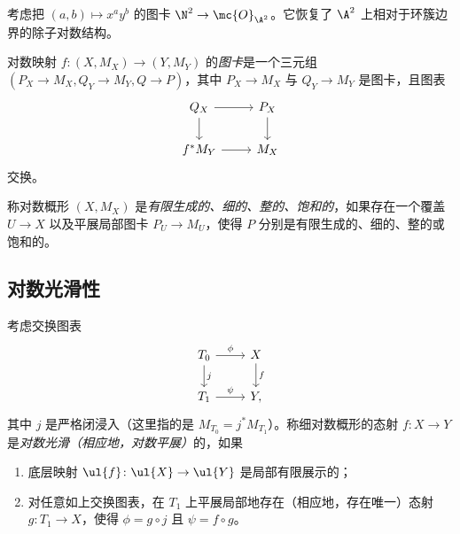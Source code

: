 \begin{exm}
    考虑把 \((a,b) \mapsto x^a y^b\) 的图卡 \(\N^2 \to \mc{O}_{\A^2}\)。它恢复了 \(\A^2\) 上相对于环簇边界的除子对数结构。
\end{exm}

\begin{defn}
    对数映射 \(f \colon (X, M_X) \to (Y, M_Y)\) 的\textit{图卡}是一个三元组 \((P_X\to M_X, Q_Y \to M_Y, Q \to P)\)，其中 \(P_X \to M_X\) 与 \(Q_Y \to M_Y\) 是图卡，且图表
    \begin{equation*}
    \begin{tikzcd}
        Q_X \ar{r} \ar{d} & P_X \ar{d} \\
        f^* M_Y \ar{r} & M_X
    \end{tikzcd}
    \end{equation*}
    交换。
\end{defn}

\begin{defn}
    称对数概形 \((X, M_X)\) 是\textit{有限生成的、细的、整的、饱和的}，如果存在一个覆盖 \(U \to X\) 以及平展局部图卡 \(P_U \to M_U\)，使得 \(P\) 分别是有限生成的、细的、整的或饱和的。
\end{defn}

\subsection{对数光滑性}%
\label{sub:Log smoothness}

\begin{defn}
    考虑交换图表
    \begin{equation*}
    \begin{tikzcd}
        T_0 \ar{r}{\phi} \ar{d}{j} & X \ar{d}{f} \\
        T_1 \ar{r}{\psi} & Y,
    \end{tikzcd}
    \end{equation*}
    其中 \(j\) 是严格闭浸入（这里指的是 \(M_{T_0} = j^* M_{T_1}\)）。称细对数概形的态射 \(f \colon X \to Y\) 是\textit{对数光滑（相应地，对数平展）}的，如果
    \begin{enumerate}
        \item 底层映射 \(\ul{f} \colon \ul{X} \to \ul{Y}\) 是局部有限展示的；
        \item 对任意如上交换图表，在 \(T_1\) 上平展局部地存在（相应地，存在唯一）态射 \(g \colon T_1 \to X\)，使得 \(\phi = g \circ j\) 且 \(\psi = f \circ g\)。
    \end{enumerate}
\end{defn}

